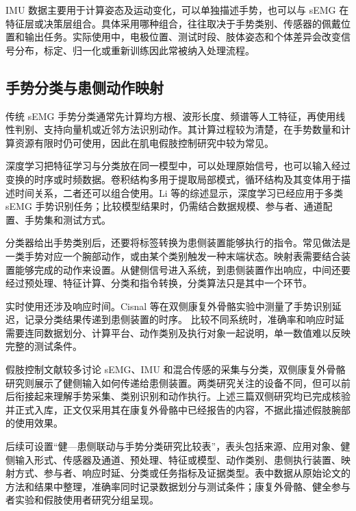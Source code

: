 IMU 数据主要用于计算姿态及运动变化，可以单独描述手势，也可以与 sEMG 在特征层或决策层组合。具体采用哪种组合，往往取决于手势类别、传感器的佩戴位置和输出任务\cite{Zhou2022HybridSensorsProsthesis}。实际使用中，电极位置、测试时段、肢体姿态和个体差异会改变信号分布，标定、归一化或重新训练因此常被纳入处理流程\cite{Scheme2011EMGPatternRecognition,Li2021SEMGGestureReview}。

\subsection{手势分类与患侧动作映射}

传统 sEMG 手势分类通常先计算均方根、波形长度、频谱等人工特征，再使用线性判别、支持向量机或近邻方法识别动作。其计算过程较为清楚，在手势数量和计算资源有限时仍可使用，因此在肌电假肢控制研究中较为常见\cite{Scheme2011EMGPatternRecognition}。

深度学习把特征学习与分类放在同一模型中，可以处理原始信号，也可以输入经过变换的时序或时频数据。卷积结构多用于提取局部模式，循环结构及其变体用于描述时间关系，二者还可以组合使用。Li 等的综述显示，深度学习已经应用于多类 sEMG 手势识别任务；比较模型结果时，仍需结合数据规模、参与者、通道配置、手势集和测试方式\cite{Li2021SEMGGestureReview}。

分类器给出手势类别后，还要将标签转换为患侧装置能够执行的指令。常见做法是一类手势对应一个腕部动作，或由某个类别触发一种末端状态。映射表需要结合装置能够完成的动作来设置。从健侧信号进入系统，到患侧装置作出响应，中间还要经过预处理、特征计算、分类和指令转换，分类算法只是其中一个环节。

实时使用还涉及响应时间。Cisnal 等在双侧康复外骨骼实验中测量了手势识别延迟，记录分类结果传递到患侧装置的时序。\cite{Cisnal2021RobHand} 比较不同系统时，准确率和响应时延需要连同数据划分、计算平台、动作类别及执行对象一起说明，单一数值难以反映完整的测试条件。


假肢控制文献较多讨论 sEMG、IMU 和混合传感的采集与分类，双侧康复外骨骼研究则展示了健侧输入如何传递给患侧装置。两类研究关注的设备不同，但可以前后衔接起来理解手势采集、类别识别和动作执行。上述三篇双侧研究均已完成核验并正式入库，正文仅采用其在康复外骨骼中已经报告的内容，不据此描述假肢腕部的使用效果。

后续可设置“健—患侧联动与手势分类研究比较表”，表头包括来源、应用对象、健侧输入形式、传感器及通道、预处理、特征或模型、动作类别、患侧执行装置、映射方式、参与者、响应时延、分类或任务指标及证据类型。表中数据从原始论文的方法和结果中整理，准确率同时记录数据划分与测试条件；康复外骨骼、健全参与者实验和假肢使用者研究分组呈现。

